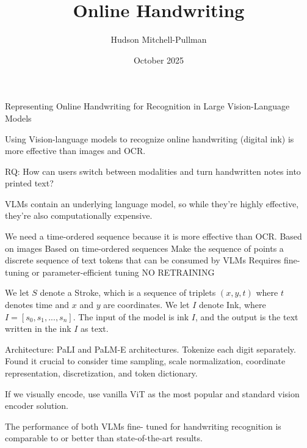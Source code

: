 \documentclass{article}
\title{Online Handwriting}
\author{Hudson Mitchell-Pullman}
\date{October 2025}
\begin{document}
\maketitle

Representing Online Handwriting for Recognition in Large Vision-Language Models

Using Vision-language models to recognize online handwriting (digital ink) is more effective than images and OCR.


RQ: How can users switch between modalities and turn handwritten notes into printed text?

VLMs contain an underlying language model, so while they’re highly effective, they’re also computationally expensive.

We need a time-ordered sequence because it is more effective than OCR.
Based on images
Based on time-ordered sequences
Make the sequence of points a discrete sequence of text tokens that can be consumed by VLMs
Requires fine-tuning or parameter-efficient tuning
NO RETRAINING

We let $S$ denote a Stroke, which is a sequence of triplets $(x, y, t)$ where $t$ denotes time and $x$ and $y$ are coordinates. We let $I$ denote Ink, where $I=[s_0, s_1, ..., s_n]$. The input of the model is ink $I$, and the output is the text written in the ink $I$ as text.

Architecture:
PaLI and PaLM-E architectures.
Tokenize each digit separately. 
Found it crucial to consider time sampling, scale normalization, coordinate representation, discretization, and token dictionary.

If we visually encode, use vanilla ViT as the most popular
and standard vision encoder solution.

The performance of both VLMs fine-
tuned for handwriting recognition is comparable to or
better than state-of-the-art results.
\end{document}

